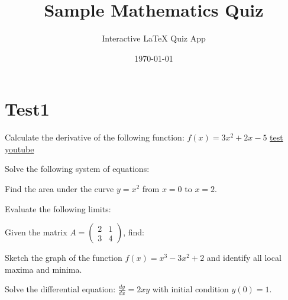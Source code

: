 \documentclass[12pt]{exam}
\title{Sample Mathematics Quiz}
\author{Interactive LaTeX Quiz App}
\date{\today}
\begin{document}
\maketitle


\section{Test1}
\begin{questions}

\question Calculate the derivative of the following function: $f(x) = 3x^2 + 2x - 5$
\href{https://www.youtube.com/watch?v=spUNpyF58BY&t=523s}{test youtube}

\question Solve the following system of equations:

\question Find the area under the curve $y = x^2$ from $x = 0$ to $x = 2$.

\question Evaluate the following limits:

\question Given the matrix $A = \begin{pmatrix} 2 & 1 \\ 3 & 4 \end{pmatrix}$, find:

\question Sketch the graph of the function $f(x) = x^3 - 3x^2 + 2$ and identify all local maxima and minima.

\question Solve the differential equation: $\frac{dy}{dx} = 2xy$ with initial condition $y(0) = 1$.

\end{questions}
\end{document}
